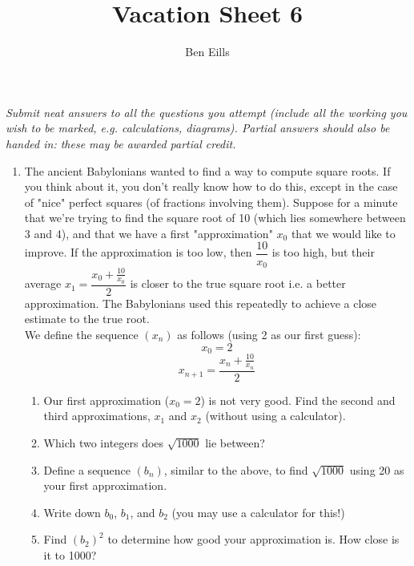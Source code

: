 \documentclass{article}
\begin{document}
\title{Vacation Sheet 6}
\author{Ben Eills}
\maketitle

\textit{Submit neat answers to all the questions you attempt (include all the working you wish to be marked, e.g. calculations, diagrams).  Partial answers should also be handed in: these may be awarded partial credit.}

\begin{enumerate}
	\item The ancient Babylonians wanted to find a way to compute square roots.  If you think about it, you don't really know how to do this, except in the case of "nice" perfect squares (of fractions involving them).  Suppose for a minute that we're trying to find the square root of 10 (which lies somewhere between 3 and 4), and that we have a first "approximation" $x_0$ that we would like to improve.  If the approximation is too low, then $\dfrac{10}{x_0}$ is too high, but their average $x_1 = \dfrac{x_0 + \frac{10}{x_0}}{2}$ is closer to the true square root i.e. a better approximation.  The Babylonians used this repeatedly to achieve a close estimate to the true root.\\
	
		We define the sequence $(x_n)$ as follows (using 2 as our first guess): \\
		$$x_0 = 2$$
		$$x_{n+1} = \dfrac{x_n + \frac{10}{x_n}}{2}$$
	
		\begin{enumerate}
			\item Our first approximation ($x_0 = 2$) is not very good.  Find the second and third approximations, $x_1$ and $x_2$ (without using a calculator).
			
			\item Which two integers does $\sqrt{1000}$ lie between?
			
			\item Define a sequence $(b_n)$, similar to the above, to find $\sqrt{1000}$ using 20 as your first approximation.
				
			\item Write down $b_0$, $b_1$, and $b_2$ (you may use a calculator for this!)
				
			\item Find $(b_2)^2$ to determine how good your approximation is.  How close is it to 1000?

		\end{enumerate}
	

\end{enumerate}
\end{document}
